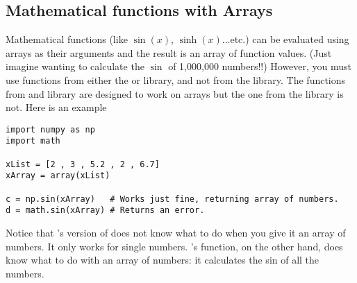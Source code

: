 \subsection*{Mathematical functions with Arrays}

Mathematical functions (like $\sin(x)$, $\sinh(x)$...etc.) can be
evaluated using arrays as their arguments and the result is an array
of function values.  (Just imagine wanting to calculate the $\sin$ of
1,000,000 numbers!!) However, you must use functions from either the
 or  library, and not from the 
library.  The functions from  and  library are
designed to work on arrays but the one from the  library is
not. Here is an example
\begin{Verbatim}
import numpy as np
import math

xList = [2 , 3 , 5.2 , 2 , 6.7]
xArray = array(xList)

c = np.sin(xArray)   # Works just fine, returning array of numbers.
d = math.sin(xArray) # Returns an error.
\end{Verbatim}
Notice that 's version of  does not
know what to do when you give it an array of numbers.  It only works
for single numbers.  's  function, on the
other hand, does know what to do with an array of numbers: it
calculates the sin of all the numbers.


